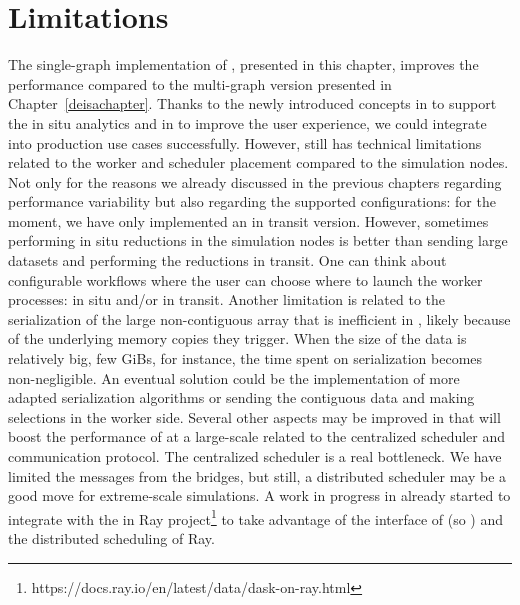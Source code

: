 
\section{Limitations}
The single-graph implementation of \deisa, presented in this chapter, improves the performance compared to the multi-graph version presented in Chapter~\ref{deisachapter}. Thanks to the newly introduced concepts in \dask to support the in situ analytics and in \deisa to improve the user experience, we could integrate \deisa into production use cases successfully. 
However, \deisa still has technical limitations related to the worker and scheduler placement compared to the simulation nodes. Not only for the reasons we already discussed in the previous chapters regarding performance variability but also regarding the supported configurations: for the moment, we have only implemented an in transit version. 
However, sometimes performing in situ reductions in the simulation nodes is better than sending large datasets and performing the reductions in transit. One can think about configurable workflows where the user can choose where to launch the worker processes: in situ and/or in transit. 
Another limitation is related to the serialization of the large non-contiguous array that is inefficient in \dask, likely because of the underlying memory copies they trigger. When the size of the data is relatively big, few GiBs, for instance, the time spent on serialization becomes non-negligible. An eventual solution could be the implementation of more adapted serialization algorithms or sending the contiguous data and making selections in the \dask worker side. 
Several other aspects may be improved in \dask that will boost the performance of \deisa at a large-scale related to the centralized scheduler and communication protocol. The centralized scheduler is a real bottleneck. We have limited the messages from the bridges, but still, a distributed scheduler may be a good move for extreme-scale simulations. A work in progress in already started to integrate \deisa with the \dask in Ray project\footnote{https://docs.ray.io/en/latest/data/dask-on-ray.html} to take advantage of the interface of \dask (so \deisa) and the distributed scheduling of Ray.   

